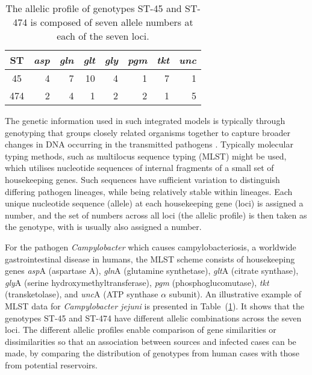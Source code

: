 \documentclass[times, doublespace]{WileyNJD-v2}%
\begin{document}
\begin{table}
  \begin{center}
    \begin{tabular}{crrrrrrr}
      \toprule
      ST & \textit{asp} & \textit{gln} & \textit{glt} & \textit{gly} & \textit{pgm}& \textit{tkt}& \textit{unc}\\ \midrule
      45  & 4 & 7 & 10 & 4 & 1 & 7 & 1\\
      474 & 2 & 4 & 1 & 2 & 2 & 1 & 5 \\
      \bottomrule
    \end{tabular}
  \end{center}
  \caption{The allelic profile of genotypes ST-45 and ST-474 is composed of seven allele numbers at each of the seven loci.}
  \label{tab0}
\end{table}

The genetic information used in such integrated models is typically through genotyping that groups closely related organisms together to capture broader changes in DNA occurring in the transmitted pathogens \cite{Cotta}. Typically molecular typing methods, such as multilocus sequence typing (MLST) \cite{Dingl, Coll} might be used, which utilises nucleotide sequences of internal fragments of a small set of housekeeping genes. Such sequences have sufficient variation to distinguish differing pathogen lineages, while being relatively stable within lineages. Each unique nucleotide sequence (allele) at each housekeeping gene (loci) is assigned a number, and the set of numbers across all loci (the allelic profile) is then taken as the genotype, with is usually also assigned a number.

For the pathogen \textit{Campylobacter} which causes campylobacteriosis, a worldwide gastrointestinal disease in humans, the MLST scheme consists of housekeeping genes \textit{asp}A (aspartase A), \textit{gln}A (glutamine synthetase), \textit{glt}A (citrate synthase), \textit{gly}A (serine hydroxymethyltransferase), \textit{pgm} (phosphoglucomutase), \textit{tkt} (transketolase), and \textit{unc}A (ATP synthase $\alpha$ subunit). An illustrative example of MLST data for \emph{Campylobacter jejuni} is presented in Table~(\ref{tab0}). It shows that the genotypes ST-45 and ST-474 have different allelic combinations across the seven loci. The different allelic profiles enable comparison of gene similarities or dissimilarities so that an association between sources and infected cases can be made, by comparing the distribution of genotypes from human cases with those from potential reservoirs.
\end{document}
